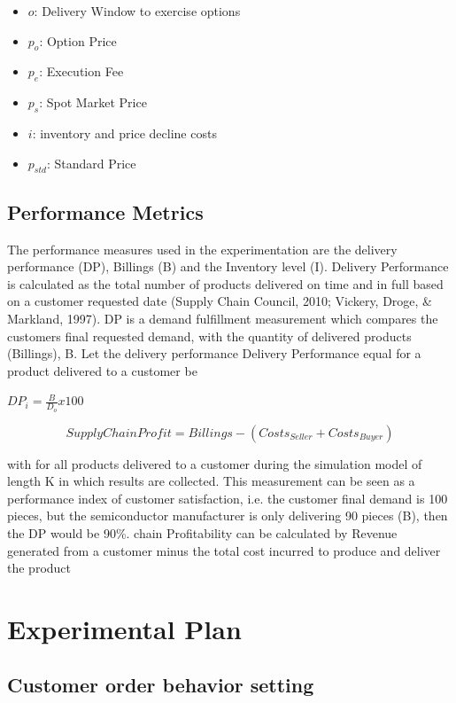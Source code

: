 \documentclass[12pt,english]{article}
\begin{document}
\begin{itemize}
\item $o$: Delivery Window to exercise options
\item $p_{o}$: Option Price
\item $p_{e}$: Execution Fee
\item $p_{s}$: Spot Market Price
\item $i$: inventory and price decline costs
\item $p_{std}$: Standard Price
\end{itemize}

\subsection{Performance Metrics}

The performance measures used in the experimentation are the delivery
performance (DP), Billings (B) and the Inventory level (I). Delivery
Performance is calculated as the total number of products delivered
on time and in full based on a customer requested date (Supply Chain
Council, 2010; Vickery, Droge, \& Markland, 1997). DP is a demand
fulfillment measurement which compares the customers final requested
demand, with the quantity of delivered products (Billings), B. Let
the delivery performance Delivery Performance equal for a product
delivered to a customer be

$DP_{i}=\frac{B}{D_{o}}x100$

\[
SupplyChainProfit=Billings-(Costs_{Seller}+Costs_{Buyer})
\]

with for all products delivered to a customer during the simulation
model of length K in which results are collected. This measurement
can be seen as a performance index of customer satisfaction, i.e.
the customer final demand is 100 pieces, but the semiconductor manufacturer
is only delivering 90 pieces (B), then the DP would be 90\%. 
chain Profitability can be calculated by Revenue generated from a
customer minus the total cost incurred to produce and deliver the
product \citet{Sunil2012}



\section{Experimental Plan}

\subsection{Customer order behavior setting}
\end{document}
